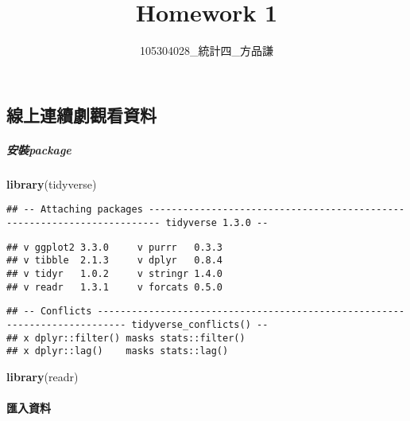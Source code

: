 \documentclass[]{article}
\title{Homework 1}
\author{105304028\_統計四\_方品謙}
\date{}
\newenvironment{Shaded}{\begin{snugshade}}{\end{snugshade}}
\newcommand{\KeywordTok}[1]{\textcolor[rgb]{0.13,0.29,0.53}{\textbf{#1}}}
\newcommand{\NormalTok}[1]{#1}
\let\oldparagraph\paragraph
\renewcommand{\paragraph}[1]{\oldparagraph{#1}\mbox{}}
\let\oldsubparagraph\subparagraph
\renewcommand{\subparagraph}[1]{\oldsubparagraph{#1}\mbox{}}
\begin{document}
\maketitle

\hypertarget{ux7ddaux4e0aux9023ux7e8cux5287ux89c0ux770bux8cc7ux6599}{%
\subsection{\texorpdfstring{\textbf{線上連續劇觀看資料}}{線上連續劇觀看資料}}\label{ux7ddaux4e0aux9023ux7e8cux5287ux89c0ux770bux8cc7ux6599}}

\hypertarget{ux5b89ux88ddpackage}{%
\subparagraph{安裝package}\label{ux5b89ux88ddpackage}}

\begin{Shaded}
\begin{Highlighting}[]
\KeywordTok{library}\NormalTok{(tidyverse)}
\end{Highlighting}
\end{Shaded}

\begin{verbatim}
## -- Attaching packages ------------------------------------------------------------------------ tidyverse 1.3.0 --
\end{verbatim}

\begin{verbatim}
## v ggplot2 3.3.0     v purrr   0.3.3
## v tibble  2.1.3     v dplyr   0.8.4
## v tidyr   1.0.2     v stringr 1.4.0
## v readr   1.3.1     v forcats 0.5.0
\end{verbatim}

\begin{verbatim}
## -- Conflicts --------------------------------------------------------------------------- tidyverse_conflicts() --
## x dplyr::filter() masks stats::filter()
## x dplyr::lag()    masks stats::lag()
\end{verbatim}

\begin{Shaded}
\begin{Highlighting}[]
\KeywordTok{library}\NormalTok{(readr)}
\end{Highlighting}
\end{Shaded}

\hypertarget{ux532fux5165ux8cc7ux6599}{%
\paragraph{匯入資料}\label{ux532fux5165ux8cc7ux6599}}
\end{document}
